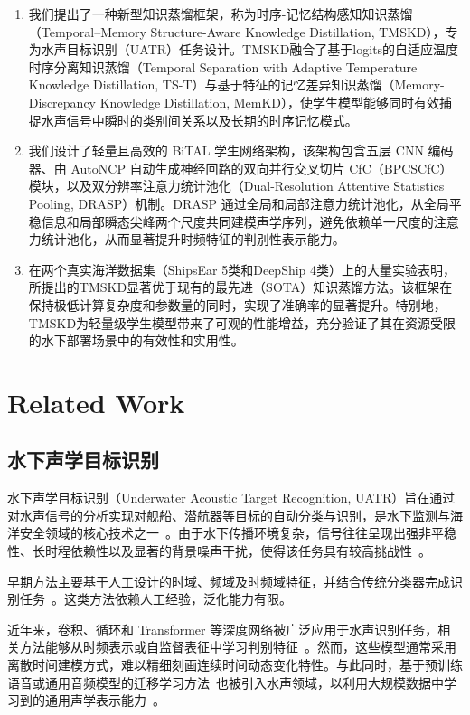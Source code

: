 \documentclass[a4paper, 12pt]{article}
\begin{document}
\begin{enumerate}[label=\arabic*)]
    \item 我们提出了一种新型知识蒸馏框架，称为时序-记忆结构感知知识蒸馏（Temporal–Memory Structure-Aware Knowledge Distillation, TMSKD），专为水声目标识别（UATR）任务设计。TMSKD融合了基于logits的自适应温度时序分离知识蒸馏（Temporal Separation with Adaptive Temperature Knowledge Distillation, TS-T）与基于特征的记忆差异知识蒸馏（Memory-Discrepancy Knowledge Distillation, MemKD），使学生模型能够同时有效捕捉水声信号中瞬时的类别间关系以及长期的时序记忆模式。
    \item 我们设计了轻量且高效的 BiTAL 学生网络架构，该架构包含五层 CNN 编码器、由 AutoNCP 自动生成神经回路的双向并行交叉切片 CfC（BPCSCfC）模块，以及双分辨率注意力统计池化（Dual-Resolution Attentive Statistics Pooling, DRASP）机制。DRASP 通过全局和局部注意力统计池化，从全局平稳信息和局部瞬态尖峰两个尺度共同建模声学序列，避免依赖单一尺度的注意力统计池化，从而显著提升时频特征的判别性表示能力。
    \item 在两个真实海洋数据集（ShipsEar 5类和DeepShip 4类）上的大量实验表明，所提出的TMSKD显著优于现有的最先进（SOTA）知识蒸馏方法。该框架在保持极低计算复杂度和参数量的同时，实现了准确率的显著提升。特别地，TMSKD为轻量级学生模型带来了可观的性能增益，充分验证了其在资源受限的水下部署场景中的有效性和实用性。
\end{enumerate}


\section{Related Work}

\subsection{水下声学目标识别}

水下声学目标识别（Underwater Acoustic Target Recognition, UATR）旨在通过对水声信号的分析实现对舰船、潜航器等目标的自动分类与识别，是水下监测与海洋安全领域的核心技术之一~\cite{David2016ShipsEar,Irfan2021DeepShip}。由于水下传播环境复杂，信号往往呈现出强非平稳性、长时程依赖性以及显著的背景噪声干扰，使得该任务具有较高挑战性~\cite{Urick1983,Jensen2011,Medwin2005}。

早期方法主要基于人工设计的时域、频域及时频域特征，并结合传统分类器完成识别任务~\cite{David2016ShipsEar,Chen2021LOFAR}。这类方法依赖人工经验，泛化能力有限。

近年来，卷积、循环和 Transformer 等深度网络被广泛应用于水声识别任务，相关方法能够从时频表示或自监督表征中学习判别特征~\cite{Chen2021LOFAR,TFTokenViT,MHTUATR}。然而，这些模型通常采用离散时间建模方式，难以精细刻画连续时间动态变化特性。与此同时，基于预训练语音或通用音频模型的迁移学习方法~\cite{Baevski2020Wav2Vec2,Kong2020PANNs}也被引入水声领域，以利用大规模数据中学习到的通用声学表示能力~\cite{ALSIUATR,CAFJTUATR}。
\end{document}
